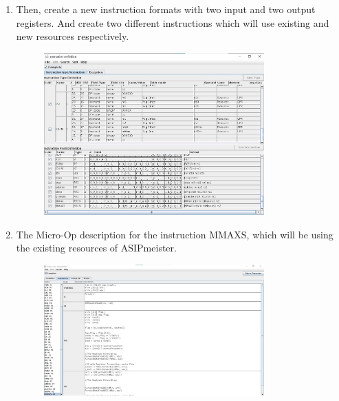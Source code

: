 \begin{enumerate}[resume]
\begin{figure}[!htb]
	\caption{}
	\label{fig:fig1}
\end{figure}
\item Then, create a new instruction formats with two input and two output
registers. And create two different instructions which will use
existing and new resources respectively.
\begin{figure}[!htb]
	\centering
	\includegraphics[width=0.8\textwidth]{src/images/image2.jpg}
	\caption{}
	\label{fig:fig2}
\end{figure}
\item The Micro-Op description for the instruction MMAXS, which will be
using the existing resources of ASIPmeister.
\begin{figure}[!htb]
	\centering
	\includegraphics[width=0.8\textwidth]{src/images/image3.jpg}
	\caption{}
	\label{fig:fig3}
\end{figure}
\end{enumerate}
